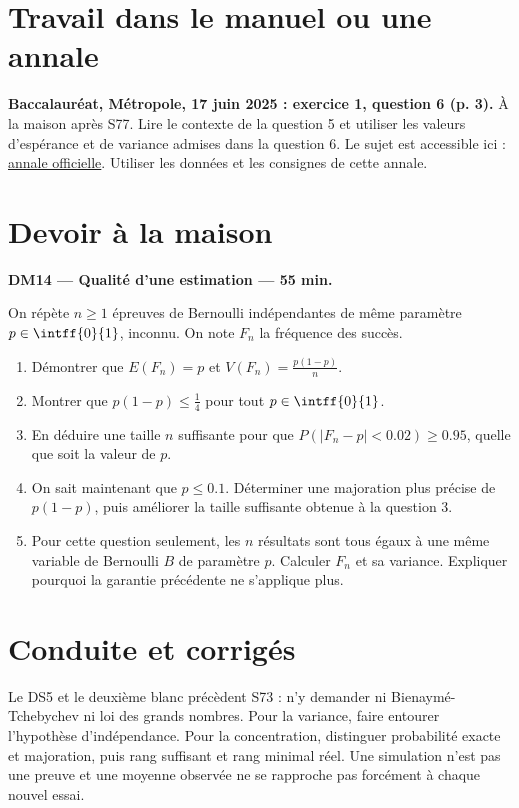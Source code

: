 \section{Travail dans le manuel ou une annale}\textbf{Baccalauréat, Métropole, 17 juin 2025 : exercice 1, question 6 (p. 3).} À la maison après S77. Lire le contexte de la question 5 et utiliser les valeurs d'espérance et de variance admises dans la question 6. Le sujet est accessible ici : \href{https://www.education.gouv.fr/sites/default/files/2025-06/baccalaur-at-g-n-ral-2025-math-matiques-440856.pdf}{annale officielle}. Utiliser les données et les consignes de cette annale.

\mxnewpage
\section{Devoir à la maison}\textbf{DM14 --- Qualité d'une estimation --- 55 min.}\par On répète $n\ge1$ épreuves de Bernoulli indépendantes de même paramètre $p\in\intff{0}{1}$, inconnu. On note $F_n$ la fréquence des succès.
\begin{enumerate}\item Démontrer que $E(F_n)=p$ et $V(F_n)=\frac{p(1-p)}n$.
\item Montrer que $p(1-p)\le\frac14$ pour tout $p\in\intff{0}{1}$.
\item En déduire une taille $n$ suffisante pour que $P(|F_n-p|<\num{0,02})\ge\num{0,95}$, quelle que soit la valeur de $p$.
\item On sait maintenant que $p\le\num{0,1}$. Déterminer une majoration plus précise de $p(1-p)$, puis améliorer la taille suffisante obtenue à la question 3.
\item Pour cette question seulement, les $n$ résultats sont tous égaux à une même variable de Bernoulli $B$ de paramètre $p$. Calculer $F_n$ et sa variance. Expliquer pourquoi la garantie précédente ne s'applique plus.\end{enumerate}

\ifmxteacher\mxnewpage\section{Conduite et corrigés}\begin{teachernote}Le DS5 et le deuxième blanc précèdent S73 : n'y demander ni Bienaymé-Tchebychev ni loi des grands nombres. Pour la variance, faire entourer l'hypothèse d'indépendance. Pour la concentration, distinguer probabilité exacte et majoration, puis rang suffisant et rang minimal réel. Une simulation n'est pas une preuve et une moyenne observée ne se rapproche pas forcément à chaque nouvel essai.\end{teachernote}

